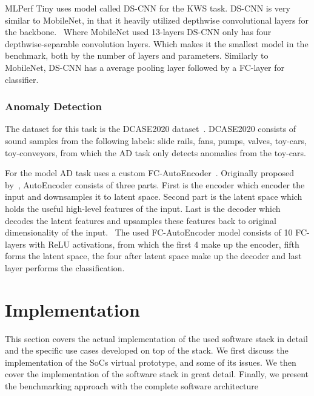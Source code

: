 \documentclass[12pt,a4paper,english
]{tunithesis}
\begin{document}
MLPerf Tiny uses model called DS-CNN for the KWS task.
DS-CNN is very similar to MobileNet, in that it heavily utilized depthwise convolutional layers for the backbone.~\cite{shaheed_ds-cnn_2022}
Where MobileNet used 13-layers DS-CNN only has four depthwise-separable convolution layers. Which makes it the smallest model in the benchmark, both by the number of layers and parameters.
Similarly to MobileNet, DS-CNN has a average pooling layer followed by a FC-layer for classifier.

\subsection{Anomaly Detection}
The dataset for this task is the DCASE2020 dataset~\cite{koizumi_description_2020}. DCASE2020 consists of sound samples from the following labels: slide rails, fans, pumps, valves, toy-cars, toy-conveyors, from which the AD task only detects anomalies from the toy-cars.

For the model AD task uses a custom FC-AutoEncoder~\cite{tinyperf}.
Originally proposed by~\cite{rumelhart_learning_1987}, AutoEncoder consists of three parts. First is the encoder which encoder the input and downsamples it to latent space. Second part is the latent space which holds the useful high-level features of the input. Last is the decoder which decodes the latent features and upsamples these features back to original dimensionality of the input.~\cite{chen_auto-encoders_2023} The used FC-AutoEncoder model consists of 10 FC-layers with ReLU activations, from which the first 4 make up the encoder, fifth forms the latent space, the four after latent space make up the decoder and last layer performs the classification.

\chapter{Implementation}
\label{ch:implementation}
This section covers the actual implementation of the used software stack in detail and the specific use cases developed on top of the stack. We first discuss the implementation of the SoCs virtual prototype, and some of its issues. We then cover the implementation of the software stack in great detail. Finally, we present the benchmarking approach with the complete software architecture
\end{document}
